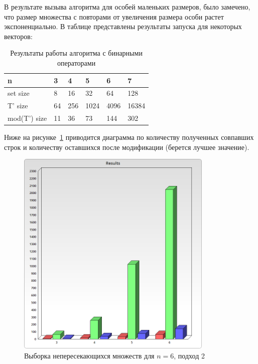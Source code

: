 В результате вызыва алгоритма для особей маленьких размеров, было замечено, что размер множества с повторами от увеличения размера особи растет экспоненциально. В таблице представлены результаты запуска для некоторых векторов:

\begin{table}[!h]
\caption{Результаты работы алгоритма с бинарными операторами}\label{tab3:apx}
\centering
\begin{tabu}{|*{6}{X[c]|}}\hline
n & 3 & 4 & 5 & 6 & 7  \\
\hline
set size & 8 & 16 & 32 & 64 & 128 \\
\hline
{T' size} & 64 & 256 & 1024 & 4096 & 16384  \\
\hline
{mod(T') size} & 11 & 36 & 73 & 144 & 302  \\
\hline
\end{tabu}
\end{table}

Ниже на рисунке~\ref{fig3} приводится диаграмма по количеству полученных совпавших строк и количеству оставшихся после модификации (берется лучшее значение).

\begin{figure}[H]
\centering
\caption{Выборка непересекающихся множеств для $n = 6$, подход 2}\label{fig3}
\includegraphics[height=10cm]{pic/res_bin.png}
\end{figure}
